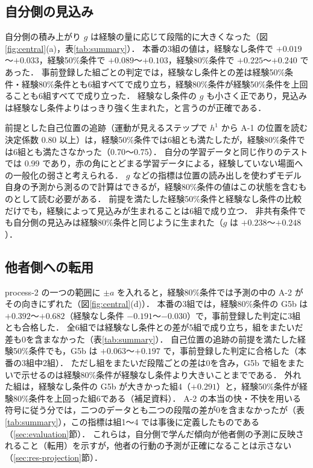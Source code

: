 \subsection{自分側の見込み}\label{sec:res-self}
自分側の積み上がり $g$ は経験の量に応じて段階的に大きくなった（図\ref{fig:central}(a)，表\ref{tab:summary}）．
本番の3組の値は，経験なし条件で $+0.019$〜$+0.033$，経験50\%条件で $+0.089$〜$+0.103$，経験80\%条件で $+0.225$〜$+0.240$ であった．
事前登録した組ごとの判定では，経験なし条件との差は経験50\%条件・経験80\%条件とも6組すべてで成り立ち，経験80\%条件が経験50\%条件を上回ることも6組すべてで成り立った．
経験なし条件の $g$ も小さく正であり，見込みは経験なし条件よりはっきり強く生まれた，と言うのが正確である．

前提とした自己位置の追跡（運動が見えるステップで $h^1$ から A-1 の位置を読む決定係数 0.80 以上）は，経験50\%条件では6組とも満たしたが，経験80\%条件では6組とも満たさなかった（0.70〜0.75）．
自分の学習データと同じ作りのテストでは 0.99 であり，赤の角にとどまる学習データによる，経験していない場面への一般化の弱さと考えられる．
$g$ などの指標は位置の読み出しを使わずモデル自身の予測から測るので計算はできるが，経験80\%条件の値はこの状態を含むものとして読む必要がある．
前提を満たした経験50\%条件と経験なし条件の比較だけでも，経験によって見込みが生まれることは6組で成り立つ．
非共有条件でも自分側の見込みは経験80\%条件と同じように生まれた（$g$ は $+0.238$〜$+0.248$）．

\subsection{他者側への転用}\label{sec:res-other}
process-2 の一つの範囲に $\pm a$ を入れると，経験80\%条件では予測の中の A-2 がその向きにずれた（図\ref{fig:central}(d)）．
本番の3組では，経験80\%条件の G5b は $+0.392$〜$+0.682$（経験なし条件 $-0.191$〜$-0.030$）で，事前登録した判定に3組とも合格した．
全6組では経験なし条件との差が5組で成り立ち，組をまたいだ差も0を含まなかった（表\ref{tab:summary}）．
自己位置の追跡の前提を満たした経験50\%条件でも，G5b は $+0.063$〜$+0.197$ で，事前登録した判定に合格した（本番の3組中2組）．
ただし組をまたいだ段階ごとの差は0を含み，G5b で組をまたいで示せるのは経験80\%条件が経験なし条件より大きいことまでである．
外れた組は，経験なし条件の G5b が大きかった組4（$+0.291$）と，経験50\%条件が経験80\%条件を上回った組6である（補足資料）．
A-2 の本当の快・不快を用いる符号に従う分では，二つのデータとも二つの段階の差が0を含まなかったが（表\ref{tab:summary}），この指標は組1〜4 では事後に定義したものである（\ref{sec:evaluation}節）．
これらは，自分側で学んだ傾向が他者側の予測に反映されること（転用）を示すが，他者の行動の予測が正確になることは示さない（\ref{sec:res-projection}節）．

